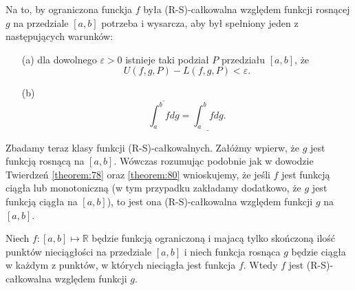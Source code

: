 \documentclass[leqno]{article}
\begin{document}
\begin{justify}
\begin{theorem}
{
    Na to, by ograniczona funckja $f$ była (R-S)-całkowalna względem funkcji rosnącej $g$ na przedziale $[a,b]$
    potrzeba i wysarcza, aby był spełniony jeden z następujących warunków:
    \begin{itemize}
        \item [(a)]
            dla dowolnego $\varepsilon > 0$ istnieje taki podział $P$ przedziału $[a,b]$, że
            \[
                U(f, g, P) - L(f, g, P) < \varepsilon.
            \]
        \item [(b)]
            \[
                \overline{\int_{a}^{b}fdg} = \underline{\int_{a}^{b}fdg}.
            \]
    \end{itemize}
}
\end{theorem}

Zbadamy teraz klasy funkcji (R-S)-całkowalnych. Załóżmy wpierw, że $g$ jest funkcją rosnącą na $[a,b]$.
Wówczas rozumując podobnie jak w dowodzie Twierdzeń \ref{theorem:78} oraz \ref{theorem:80} wnioskujemy, że
jeśli $f$ jest funkcją ciągła lub monotoniczną (w tym przypadku zakładamy dodatkowo, że $g$ jest funkcją ciągła na $[a,b]$), to
jest ona (R-S)-całkowalna względem funkcji $g$ na $[a,b]$.

\begin{theorem}
{
    Niech $f : [a,b] \mapsto \mathbb{R}$ będzie funkcją ograniczoną i majacą tylko skończoną ilość punktów nieciągłości
    na przedziale $[a,b]$ i niech funkcja rosnąca $g$ będzie ciągła w każdym z punktów, w których nieciągła jest funkcja $f$.
    Wtedy $f$ jest (R-S)-całkowalna względem funkcji $g$.
}
\end{theorem}


\end{justify}
\end{document}
